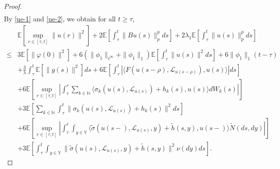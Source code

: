 \documentclass[11pt]{article}
\numberwithin{equation}{section}
\theoremstyle{plain}
\begin{document}
\begin{proof}
\begin{align}
 \end{align}
 By \eqref{ue-1} and \eqref{ue-2}, we 
 obtain for all $t\ge \tau$,
 \begin{align} \label{ue-3}
       & \mathbb{E} \left[ \sup_{r \in [\tau, t]} \|u(r)\|^2 \right]
         + 2 \mathbb{E} \left[ \int_{\tau}^{t} \|B u(s)\|_p^p ds \right]
         + 2 \lambda_1 \mathbb{E} \left[ \int_{\tau}^{t} \|u(s)\|^p_p ds \right]  \nonumber \\
  \le & 3 \mathbb{E} \left[ \|\varphi(0)\|^2 \right]
         + 6 \left( \|\phi_1\|_{\ell^\infty} + \|\phi_1\|_1 \right)
                 \mathbb{E} \left[ \int_{\tau}^{t} \| u(s)\|^2 ds \right]
         + 6 \|\phi_1\|_1 (t-\tau)  \nonumber \\
       & + \frac{3}{\lambda} \int_{\tau}^{t} \mathbb{E} \left[ \|g(s)\|^2 \right] ds
         + 6 \mathbb{E}
                \left[ \int_{\tau}^{t} \left| \langle F(u(s-\rho),\mathcal{L}_{u(s-\rho)}),  u(s) \rangle \right| ds
                \right] \nonumber \\
       & + 6 \mathbb{E}
                \left[ \sup_{r \in [\tau, t]}
                       \left| \int_{\tau}^{r} \sum_{k \in \mathbb{N} }
                                 \langle \sigma_k(u(s), \mathcal{L}_{u(s)}) + h_k(s),
                                         u(s)
                                 \rangle dW_k(s)
                       \right|
                \right]  \nonumber \\
       & + 3\mathbb{E}
              \left[ \sum_{k \in \mathbb{N} }
                        \int_{\tau}^{t}
                           \| \sigma_k(u(s), \mathcal{L}_{u(s)}) + h_k(s)\|^2 ds
              \right] \nonumber \\
       & + 6 \mathbb{E}
                \left[ \sup_{r \in [\tau, t]}
                       \left| 
                             \int_{\tau}^{r}
                              \int_{y \in \mathbb{Y} }
                \langle
              \widetilde{\sigma}(u(s-), \mathcal{L}_{u(s)},y) +  \widetilde{h}(s,y), 
                       u(s-) \rangle
               \widetilde{N}(ds, dy) 
                        \right|
                \right]  \nonumber \\
       & + 3 \mathbb{E}
                \left[  
                          \int_{\tau}^{t} \int_{y \in \mathbb{Y} }
                                \|\widetilde{\sigma}(u(s), \mathcal{L}_{u(s)},y) + \widetilde{h}(s,y)\|^2
                          \nu(dy) ds
                \right]. 
 \end{align}
              

\end{proof}
\end{document}
